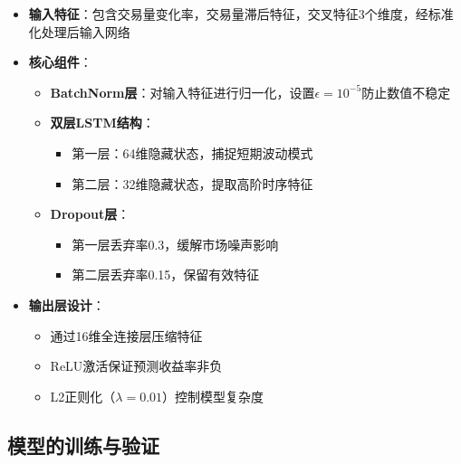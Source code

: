 \documentclass[a4paper,12pt]{ctexart}
\begin{document}
\begin{itemize}
\item \textbf{输入特征}：包含交易量变化率，交易量滞后特征，交叉特征3个维度，经标准化处理后输入网络

\item \textbf{核心组件}：
  \begin{itemize}
  \item \textbf{BatchNorm层}：对输入特征进行归一化，设置$\epsilon=10^{-5}$防止数值不稳定
  \item \textbf{双层LSTM结构}：
    \begin{itemize}
    \item 第一层：64维隐藏状态，捕捉短期波动模式
    \item 第二层：32维隐藏状态，提取高阶时序特征
    \end{itemize}
  \item \textbf{Dropout层}：
    \begin{itemize}
    \item 第一层丢弃率0.3，缓解市场噪声影响
    \item 第二层丢弃率0.15，保留有效特征
    \end{itemize}
  \end{itemize}

\item \textbf{输出层设计}：
  \begin{itemize}
  \item 通过16维全连接层压缩特征
  \item ReLU激活保证预测收益率非负
  \item L2正则化（$\lambda=0.01$）控制模型复杂度
  \end{itemize}
\end{itemize}


\newpage
\subsection{模型的训练与验证}
\end{document}
